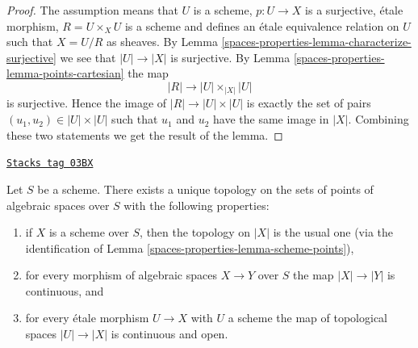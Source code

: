 \begin{proof}
The assumption means that $U$ is a scheme, $p : U \to X$ is a surjective,
\'etale morphism, $R = U \times_X U$ is a scheme and defines an \'etale
equivalence relation on $U$ such that $X = U/R$ as sheaves. By
Lemma \ref{spaces-properties-lemma-characterize-surjective}
we see that $|U| \to |X|$ is surjective. By
Lemma \ref{spaces-properties-lemma-points-cartesian}
the map
$$
|R| \longrightarrow |U| \times_{|X|} |U|
$$
is surjective. Hence the image of $|R| \to |U| \times |U|$ is
exactly the set of pairs $(u_1, u_2) \in |U| \times |U|$
such that $u_1$ and $u_2$ have the same image in $|X|$.
Combining these two statements we get the result of the lemma.
\end{proof}

\begin{lemma}
\label{spaces-properties-lemma-topology-points}
\href{https://stacks.math.columbia.edu/tag/03BX}{\texttt{Stacks tag 03BX}}

Let $S$ be a scheme. There exists a unique topology on the sets of points
of algebraic spaces over $S$ with the following properties:
\begin{enumerate}
\item if $X$ is a scheme over $S$, then the topology on $|X|$ is the usual one
(via the identification of Lemma \ref{spaces-properties-lemma-scheme-points}),
\item for every morphism of algebraic spaces $X \to Y$ over $S$
the map $|X| \to |Y|$ is continuous, and
\item for every \'etale morphism $U \to X$ with $U$ a scheme
the map of topological spaces $|U| \to |X|$ is continuous and open.
\end{enumerate}
\end{lemma}

